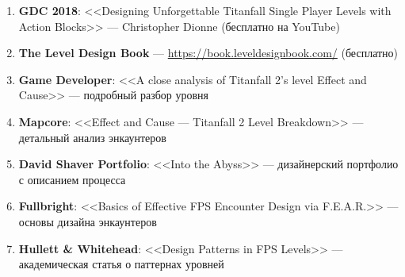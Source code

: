 \documentclass[a4paper,11pt]{report}
\begin{document}
\begin{enumerate}[leftmargin=*]
  \item \textbf{GDC 2018}: <<Designing Unforgettable Titanfall Single Player
    Levels with Action Blocks>> --- Christopher Dionne (бесплатно на YouTube)
  \item \textbf{The Level Design Book} ---
    \url{https://book.leveldesignbook.com/} (бесплатно)
  \item \textbf{Game Developer}: <<A close analysis of Titanfall 2's
    level Effect and Cause>> --- подробный разбор уровня
  \item \textbf{Mapcore}: <<Effect and Cause --- Titanfall 2 Level
    Breakdown>> --- детальный анализ энкаунтеров
  \item \textbf{David Shaver Portfolio}: <<Into the Abyss>> ---
    дизайнерский портфолио с описанием процесса
  \item \textbf{Fullbright}: <<Basics of Effective FPS Encounter Design
    via F.E.A.R.>> --- основы дизайна энкаунтеров
  \item \textbf{Hullett \& Whitehead}: <<Design Patterns in FPS Levels>> ---
    академическая статья о паттернах уровней
\end{enumerate}

\vspace{1cm}

\begin{center}
\end{center}
\end{document}
